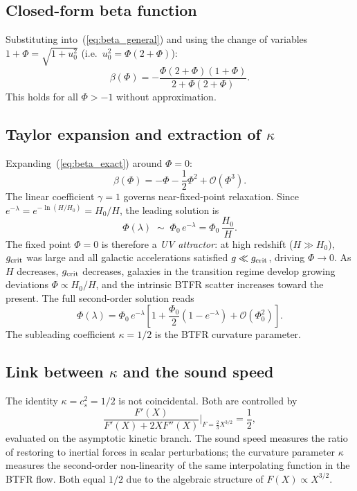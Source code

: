 \documentclass[11pt,a4paper]{article}
\begin{document}
\subsection{Closed-form beta function}
Substituting into~(\ref{eq:beta_general}) and using the change of variables
$1+\Phi = \sqrt{1+u_0^2}$ (i.e.\ $u_0^2 = \Phi(2+\Phi)$):
\begin{equation}
  \boxed{\beta(\Phi) = -\frac{\Phi(2+\Phi)(1+\Phi)}{2+\Phi(2+\Phi)}}.
  \label{eq:beta_exact}
\end{equation}
This holds for all $\Phi > -1$ without approximation.

\subsection{Taylor expansion and extraction of $\kappa$}
\label{subsec:Taylor_kappa}
Expanding~(\ref{eq:beta_exact}) around $\Phi=0$:
\begin{equation}
  \beta(\Phi) = -\Phi - \frac{1}{2}\Phi^2 + \mathcal{O}(\Phi^3).
  \label{eq:beta_expanded}
\end{equation}
The linear coefficient $\gamma = 1$ governs near-fixed-point relaxation.
Since $e^{-\lambda} = e^{-\ln(H/H_0)} = H_0/H$, the leading solution is
\begin{equation}
  \Phi(\lambda) \;\sim\; \Phi_0\,e^{-\lambda} = \Phi_0\,\frac{H_0}{H}.
  \label{eq:Phi_relaxation}
\end{equation}
The fixed point $\Phi=0$ is therefore a \emph{UV attractor}: at high redshift
($H\gg H_0$), $g_{\rm crit}$ was large and all galactic accelerations satisfied
$g\ll g_{\rm crit}$, driving $\Phi\to 0$.  As $H$ decreases, $g_{\rm crit}$
decreases, galaxies in the transition regime develop growing deviations
$\Phi\propto H_0/H$, and the intrinsic BTFR scatter increases toward the present.
The full second-order solution reads
\begin{equation}
  \Phi(\lambda) = \Phi_0\,e^{-\lambda}\!\left[1
    + \frac{\Phi_0}{2}\!\left(1 - e^{-\lambda}\right)
    + \mathcal{O}(\Phi_0^2)\right].
\end{equation}
The subleading coefficient $\kappa = 1/2$ is the BTFR curvature parameter.

\subsection{Link between $\kappa$ and the sound speed}
The identity $\kappa = c_s^2 = 1/2$ is not coincidental.  Both are controlled by
\begin{equation}
  \frac{F'(X)}{F'(X)+2XF''(X)}\bigg|_{F=\frac{2}{3}X^{3/2}} = \frac{1}{2},
\end{equation}
evaluated on the asymptotic kinetic branch.  The sound speed measures the ratio
of restoring to inertial forces in scalar perturbations; the curvature parameter
$\kappa$ measures the second-order non-linearity of the same interpolating function
in the BTFR flow.  Both equal $1/2$ due to the algebraic structure of
$F(X)\propto X^{3/2}$.
\end{document}
